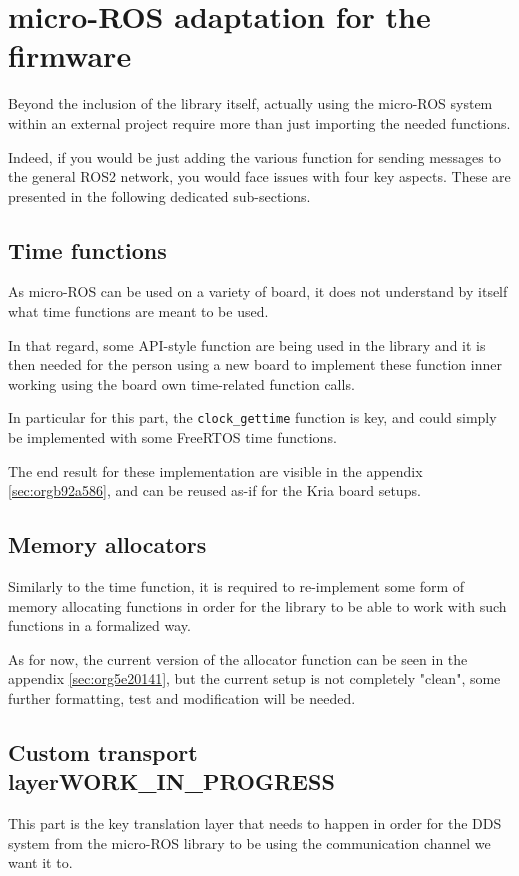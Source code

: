 \documentclass[10pt]{article}
\begin{document}
\section{micro-ROS adaptation for the firmware}
\label{sec:org1f26f26}
Beyond the inclusion of the library itself, actually using the micro-ROS system
within an external project require more than just importing the needed
functions.

Indeed, if you would be just adding the various function for sending messages to
the general ROS2 network, you would face issues with four key aspects.
These are presented in the following dedicated sub-sections.

\subsection{Time functions}
\label{sec:orgaba3dc4}
As micro-ROS can be used on a variety of board, it does not understand by itself
what time functions are meant to be used.

In that regard, some API-style function are being
used in the library and it is then needed for the person using a new board
to implement these function inner working using the board own time-related
function calls.

In particular for this part, the \texttt{clock\_gettime} function is key, and could
simply be implemented with some FreeRTOS time functions.

The end result for these implementation are visible in the appendix \ref{sec:orgb92a586},
and can be reused as-if for the Kria board setups.

\subsection{Memory allocators}
\label{sec:orga7d2ff0}
Similarly to the time function, it is required to re-implement some form of memory allocating
functions in order for the library to be able to work with such functions in a formalized way.

As for now, the current version of the allocator function can be seen in the
appendix \ref{sec:org5e20141}, but the current setup is not
completely "clean", some further formatting, test and modification will be needed.

\subsection{Custom transport layer\hfill{}\textsc{WORK\_IN\_PROGRESS}}
\label{sec:org6407c02}
This part is the key translation layer that needs to happen in order for the
DDS system from the micro-ROS library to be using the communication channel we
want it to.
\end{document}
